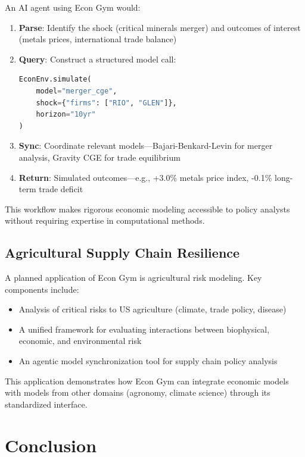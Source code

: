 \documentclass[12pt]{article}
\begin{document}
An AI agent using Econ Gym would:
\begin{enumerate}
    \item \textbf{Parse}: Identify the shock (critical minerals merger) and outcomes of interest (metals prices, international trade balance)
    
    \item \textbf{Query}: Construct a structured model call:
    \begin{lstlisting}[language=Python]
EconEnv.simulate(
    model="merger_cge",
    shock={"firms": ["RIO", "GLEN"]},
    horizon="10yr"
)
    \end{lstlisting}
    
    \item \textbf{Sync}: Coordinate relevant models---Bajari-Benkard-Levin for merger analysis, Gravity CGE for trade equilibrium
    
    \item \textbf{Return}: Simulated outcomes---e.g., +3.0\% metals price index, -0.1\% long-term trade deficit
\end{enumerate}

This workflow makes rigorous economic modeling accessible to policy analysts without requiring expertise in computational methods.

\subsection{Agricultural Supply Chain Resilience}

A planned application of Econ Gym is agricultural risk modeling. Key components include:
\begin{itemize}
    \item Analysis of critical risks to US agriculture (climate, trade policy, disease)
    \item A unified framework for evaluating interactions between biophysical, economic, and environmental risk
    \item An agentic model synchronization tool for supply chain policy analysis
\end{itemize}

This application demonstrates how Econ Gym can integrate economic models with models from other domains (agronomy, climate science) through its standardized interface.

\section{Conclusion} \label{sec:conclusion}
\end{document}
